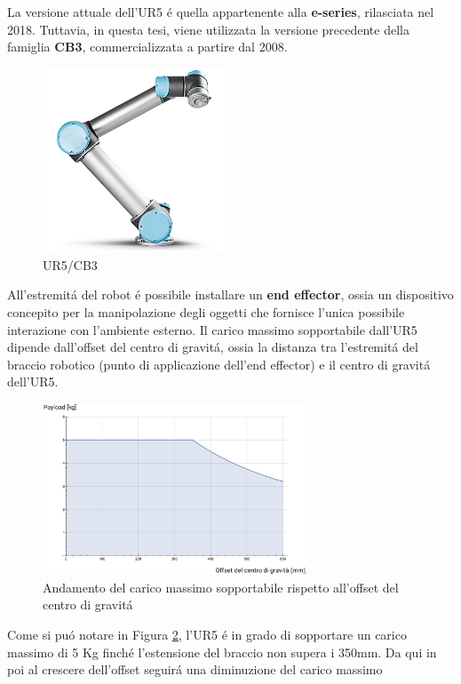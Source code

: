 La versione attuale dell'UR5 \'{e} quella appartenente alla \textbf{e-series}, rilasciata nel 2018. 
Tuttavia, in questa tesi, viene utilizzata la versione precedente della famiglia \textbf{CB3}, commercializzata a partire dal 
2008.
\begin{figure}[H]
    \centering
    \includegraphics*[width=0.5\textwidth]{images/ur5.png}
    \caption{UR5/CB3}
    \label{fig:ur5}
\end{figure}
All'estremit\'{a} del robot \'{e} possibile installare un \textbf{end effector}, ossia un dispositivo concepito 
per la manipolazione degli oggetti che fornisce l'unica possibile interazione con l'ambiente esterno.
Il carico massimo sopportabile dall'UR5 dipende dall'offset del centro di gravit\'{a}, ossia la distanza tra l'estremit\'{a}  
del braccio robotico (punto di applicazione dell'end effector) e il centro di gravit\'{a} dell'UR5. 
\begin{figure}[H]
    \centering
    \includegraphics*[width=0.7\textwidth]{images/payload.png}
    \caption{Andamento del carico massimo sopportabile rispetto all'offset del centro di gravit\'{a}}
    \label{fig:payload}
\end{figure}
Come si pu\'{o} notare in Figura \ref{fig:payload}, l'UR5 \'{e} in grado di sopportare un carico massimo di 5 Kg finch\'{e} 
l'estensione del braccio non supera i 350mm. Da qui in poi al crescere dell'offset seguir\'{a} una diminuzione del carico massimo 
